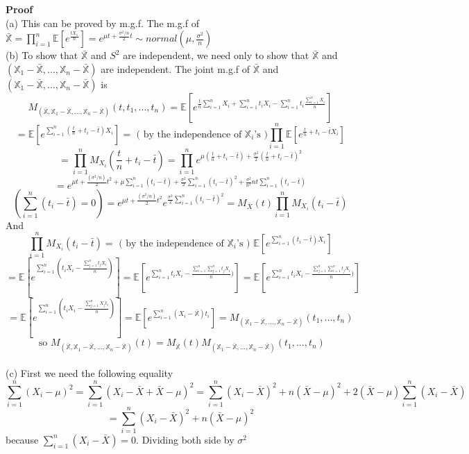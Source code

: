 \documentclass[a4paper,12pt]{article}
\begin{document}
\textbf{Proof}\\
(a) This can be proved by m.g.f. The m.g.f of $\bar{\mathbb{X}} = \prod_{i=1}^n \mathbb{E}[e^{\frac{tX_1}{n}}] = e^{\mu t + \frac{\sigma^2 / n}{2}t} \sim normal(\mu, \frac{\sigma^2}{n})$\\
(b) To show that $\bar{\mathbb{X}}$ and $S^2$ are independent, we need only to show that $\bar{\mathbb{X}}$ and $(\mathbb{X}_1-\bar{\mathbb{X}}, ..., \mathbb{X}_n-\bar{\mathbb{X}})$ are independent.
The joint m.g.f of $\bar{\mathbb{X}}$ and $(\mathbb{X}_1-\bar{\mathbb{X}}, ..., \mathbb{X}_n-\bar{\mathbb{X}})$ is
$$M_{(\bar{\mathbb{X}}, \mathbb{X}_1-\bar{\mathbb{X}}, ..., \mathbb{X}_n-\bar{\mathbb{X}})}( t, t_1, ..., t_n ) = \mathbb{E}[e^{ \frac{t}{n}\sum_{i=1}^n X_i + \sum_{i=1}^n t_i X_i - \sum_{i=1}^n t_i \frac{\sum_{i=1}^n X_i}{n} }]$$
$$= \mathbb{E}[e^{\sum_{i=1}^n( \frac{t}{n}+t_i-\bar{t} )X_i}] = \text{ ( by the independence of } \mathbb{X}_i \text{'s )} \prod_{i=1}^n \mathbb{E}[e^{\frac{t}{n}+t_i-\bar{t} X_i}]$$
$$= \prod_{i=1}^n M_{X_i}(\frac{t}{n}+t_i-\bar{t}) = \prod_{i=1}^n e^{\mu (\frac{t}{n}+t_i-\bar{t}) + \frac{\sigma^2}{2} (\frac{t}{n}+t_i-\bar{t})^2 }$$
$$= e^{ \mu t + \frac{(\sigma^2/n)}{2}t^2 + \mu  \sum_{i=1}^n (t_i - \bar{t}) + \frac{\sigma^2}{2} \sum_{i=1}^n (t_i-\bar{t})^2 + \frac{\sigma^2}{n^2}nt \sum_{i=1}^n (t_i - \bar{t})}$$
$$( \sum_{i=1}^n (t_i - \bar{t}) = 0 ) = e^{ \mu t + \frac{(\sigma^2/n)}{2}t^2}e^{\frac{\sigma^2}{2} \sum_{i=1}^n (t_i-\bar{t})^2} = M_{\bar{X}}(t)\prod_{i=1}^n M_{X_i}(t_i-\bar{t})$$
And
$$\prod_{i=1}^n M_{X_i}(t_i-\bar{t}) =  \text{ ( by the independence of } \mathbb{X}_i \text{'s ) } \mathbb{E}[e^{ \sum_{i=1}^n (t_i-\bar{t})X_i }]$$
$$= \mathbb{E}[e^{ \sum_{i=1}^n (t_i X_i-\frac{\sum_{j=1}^n t_j X_i}{n}) }] = \mathbb{E}[e^{ \sum_{i=1}^n t_i X_i-\frac{\sum_{i=1}^n \sum_{j=1}^n t_j X_i}{n}) }] = \mathbb{E}[e^{ \sum_{i=1}^n t_i X_i-\frac{\sum_{j=1}^n \sum_{i=1}^n t_j X_i}{n}) }]$$
$$ = \mathbb{E}[e^{ \sum_{i=1}^n (t_i X_i-\frac{\sum_{j=1}^n X_j t_i}{n}) }] = \mathbb{E}[e^{ \sum_{i=1}^n (X_i-\bar{\mathbb{X}}) t_i} ] = M_{(\mathbb{X}_1-\bar{\mathbb{X}}, ..., \mathbb{X}_n-\bar{\mathbb{X}})}( t_1, ..., t_n )$$
$$\text{ so }M_{(\bar{\mathbb{X}}, \mathbb{X}_1-\bar{\mathbb{X}}, ..., \mathbb{X}_n-\bar{\mathbb{X}})}(t) = M_{\bar{\mathbb{X}}}(t) M_{(\mathbb{X}_1-\bar{\mathbb{X}}, ..., \mathbb{X}_n-\bar{\mathbb{X}})}( t_1, ..., t_n )$$\\
(c) First we need the following equality
$$\sum_{i=1}^n (X_i-\mu)^2 = \sum_{i=1}^n (X_i-\bar{X}+\bar{X}-\mu)^2 = \sum_{i=1}^n (X_i-\bar{X})^2 + n(\bar{X}-\mu)^2 + 2(\bar{X}-\mu)\sum_{i=1}^n(X_i-\bar{X})$$
$$= \sum_{i=1}^n (X_i-\bar{X})^2 + n(\bar{X}-\mu)^2$$ because $\sum_{i=1}^n(X_i-\bar{X}) = 0$. Dividing both side by $\sigma^2$
\end{document}
